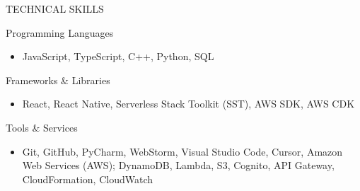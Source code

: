 \documentclass[]{mcdowellcv}
\begin{document}
	\begin{cvsection}{TECHNICAL SKILLS}
		\begin{cvsubsection}{Programming Languages}{}{}
			\begin{itemize}
				\item JavaScript, TypeScript, C++, Python, SQL
			\end{itemize}
		\end{cvsubsection}
		\begin{cvsubsection}{Frameworks \& Libraries}{}{}
			\begin{itemize}
				\item React, React Native, Serverless Stack Toolkit (SST), AWS SDK, AWS CDK
			\end{itemize}
		\end{cvsubsection}
		\begin{cvsubsection}{Tools \& Services}{}{}
			\begin{itemize}
				\item Git, GitHub, PyCharm, WebStorm, Visual Studio Code, Cursor, Amazon Web Services (AWS); DynamoDB, Lambda, S3, Cognito, API Gateway, CloudFormation, CloudWatch
			\end{itemize}
		\end{cvsubsection}
	\end{cvsection}
	
\end{document}
